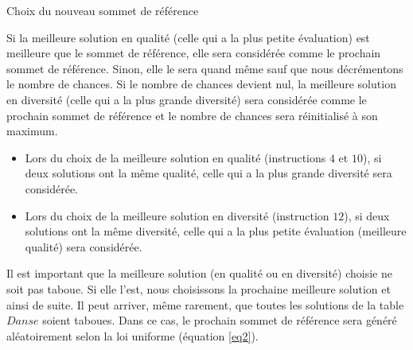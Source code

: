 \begin{algorithm}[H]
	\caption{Choix du nouveau sommet de référence}
\end{algorithm}
\bigskip

Si la meilleure solution en qualité (celle qui a la plus petite évaluation) est meilleure que le sommet de référence, elle sera considérée comme le prochain sommet de référence. Sinon, elle le sera quand même sauf que nous décrémentons le nombre de chances. Si le nombre de chances devient nul, la meilleure solution en diversité (celle qui a la plus grande diversité) sera considérée comme le prochain sommet de référence et le nombre de chances sera réinitialisé à son maximum.

\begin{itemize}
	\item Lors du choix de la meilleure solution en qualité (instructions $4$ et $10$), si deux solutions ont la même qualité, celle qui a la plus grande diversité sera considérée.
	\item Lors du choix de la meilleure solution en diversité (instruction $12$), si deux solutions ont la même diversité, celle qui a la plus petite évaluation (meilleure qualité) sera considérée. 
\end{itemize} 
 
Il est important que la meilleure solution (en qualité ou en diversité) choisie ne soit pas taboue. Si elle l'est, nous choisissons la prochaine meilleure solution et ainsi de suite. Il peut arriver, même rarement, que toutes les solutions de la table $Danse$ soient taboues. Dans ce cas, le prochain sommet de référence sera généré aléatoirement selon la loi uniforme (équation \ref{eq2}).

